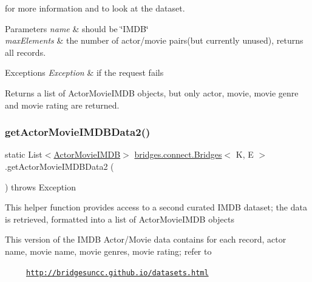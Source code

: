 for more information and to look at the dataset.


\begin{DoxyParams}{Parameters}
{\em name} & should be \char`\"{}\+I\+M\+D\+B\char`\"{} \\
\hline
{\em max\+Elements} & the number of actor/movie pairs(but currently unused), returns all records. \\
\hline
\end{DoxyParams}

\begin{DoxyExceptions}{Exceptions}
{\em Exception} & if the request fails\\
\hline
\end{DoxyExceptions}
\begin{DoxyReturn}{Returns}
a list of Actor\+Movie\+I\+M\+DB objects, but only actor, movie, movie genre and movie rating are returned. 
\end{DoxyReturn}
\hypertarget{classbridges_1_1connect_1_1_bridges_a02031d2a33b708588774473d36ba35c2}{}\label{classbridges_1_1connect_1_1_bridges_a02031d2a33b708588774473d36ba35c2} 
\subsubsection{\texorpdfstring{get\+Actor\+Movie\+I\+M\+D\+B\+Data2()}{getActorMovieIMDBData2()}}
{\footnotesize\ttfamily static List$<$\hyperlink{classbridges_1_1data__src__dependent_1_1_actor_movie_i_m_d_b}{Actor\+Movie\+I\+M\+DB}$>$ \hyperlink{classbridges_1_1connect_1_1_bridges}{bridges.\+connect.\+Bridges}$<$ K, E $>$.get\+Actor\+Movie\+I\+M\+D\+B\+Data2 (\begin{DoxyParamCaption}{ }\end{DoxyParamCaption}) throws Exception\hspace{0.3cm}{\ttfamily [static]}}

This helper function provides access to a second curated I\+M\+DB dataset; the data is retrieved, formatted into a list of Actor\+Movie\+I\+M\+DB objects

This version of the I\+M\+DB Actor/\+Movie data contains for each record, actor name, movie name, movie genres, movie rating; refer to 

~~~~~\href{http://bridgesuncc.github.io/datasets.html}{\tt http\+://bridgesuncc.\+github.\+io/datasets.\+html} 

